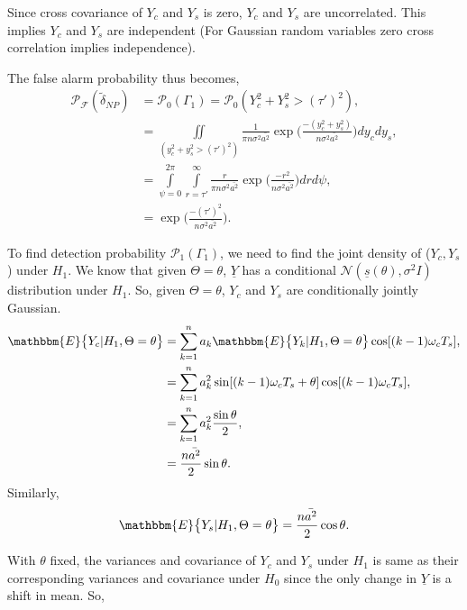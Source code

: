 \documentclass[a4paper,english,12pt]{article}
\begin{document}
\par Since cross covariance of $Y_c$ and $Y_s$ is zero, $Y_c$ and $Y_s$ are uncorrelated. This implies $Y_c$ and $Y_s$ 
are independent (For Gaussian random variables zero cross correlation implies independence).
\par The false alarm probability thus becomes,
\begin{equation*}
\begin{aligned}
\mathcal{P_F}(\tilde{\delta}_{NP}) &=\mathcal{P}_0(\Gamma_1)   
= \mathcal{P}_0(Y_c^2+Y_s^2>(\tau')^2), \\
&=\iint \limits_{(y_c^2+y_s^2>(\tau')^2)}^{} \frac{1}{\pi n\sigma^2\bar{a^2}}  \exp\bigg(\frac{ -(y_c^2+y_s^2)}{n\sigma^2\bar{a^2}}\bigg)dy_c dy_s, \\
&=\int \limits_{\psi=0}^{2\pi}\int \limits_{r=\tau'}^{\infty}\frac{r}{\pi n\sigma^2\bar{a^2}}   \exp\bigg(\frac{ -r^2}{n\sigma^2\bar{a^2}}\bigg)dr d\psi,  \\
&=\exp\bigg(\frac{-(\tau')^2}{n\sigma^2\bar{a^2}}\bigg).
\end{aligned}
\end{equation*}
\par To find detection probability $\mathcal{P}_1(\Gamma_1)$, we need to find the joint density of ($Y_c,Y_s$) under $H_1$. We know that given $\Theta=\theta$, $\underline{Y}$ has a conditional $\mathcal{N}(\underline{s}(\theta),\sigma^2I)$ distribution under $H_1$. So, given $\Theta=\theta$, $Y_c$ and $Y_s$ are conditionally jointly Gaussian.     
\begin{equation*}
\begin{aligned}
\mathbbm{E}\big\{Y_c|H_1, \Theta=\theta\big\} &= \sum_{k=1}^{n}a_k\mathbbm{E}\big\{Y_k|H_1, \Theta=\theta\big\}\cos[(k-1)\omega_c T_s], \\
&=\sum_{k=1}^{n}a_k^2 \sin[(k-1)\omega_c T_s+\theta]\cos[(k-1)\omega_c T_s], \\
&=\sum_{k=1}^{n}a_k^2 \frac{\sin\theta}{2}, \\
&=\frac{n\bar{a^2}}{2}\sin\theta.
\end{aligned}
\end{equation*}
Similarly, 
\begin{equation*}
\mathbbm{E}\big\{Y_s|H_1, \Theta=\theta\big\}=
\frac{n\bar{a^2}}{2}\cos\theta.
\end{equation*}
\par With $\theta$ fixed, the variances and covariance of $Y_c$ and $Y_s$ under $H_1$ is same as their corresponding variances and covariance under $H_0$ since the only change in $\underline{Y}$ is a shift in mean. So,
\end{document}
